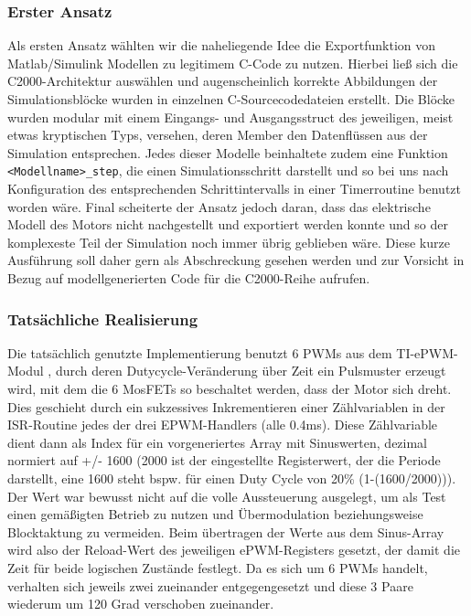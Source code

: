 \subsubsection{Erster Ansatz}
  Als ersten Ansatz wählten wir die naheliegende Idee die Exportfunktion von Matlab/Simulink Modellen zu legitimem C-Code zu nutzen. Hierbei ließ sich die C2000-Architektur auswählen und augenscheinlich korrekte Abbildungen der Simulationsblöcke wurden in einzelnen C-Sourcecodedateien erstellt. Die Blöcke wurden modular mit einem Eingangs- und Ausgangsstruct des jeweiligen, meist etwas kryptischen Typs,%
   versehen, deren Member den Datenflüssen aus der Simulation entsprechen. Jedes dieser Modelle beinhaltete zudem eine Funktion {\lstinline[breaklines=true]$<Modellname>_step$}, die einen Simulationsschritt darstellt und so bei uns nach Konfiguration des entsprechenden Schrittintervalls in einer Timerroutine benutzt worden wäre. Final scheiterte der Ansatz jedoch daran, dass das elektrische Modell des Motors nicht nachgestellt und exportiert werden konnte und so der komplexeste Teil der Simulation noch immer übrig geblieben wäre. Diese kurze Ausführung soll daher gern als Abschreckung gesehen werden %
    und zur Vorsicht in Bezug auf modellgenerierten Code für die C2000-Reihe aufrufen.

\subsubsection{Tatsächliche Realisierung}
  Die tatsächlich genutzte Implementierung benutzt 6 PWMs aus dem TI-ePWM-Modul , durch deren Dutycycle-Veränderung über Zeit ein Pulsmuster erzeugt wird, mit dem die 6 MosFETs so beschaltet werden, dass der Motor sich dreht. Dies geschieht durch ein sukzessives Inkrementieren einer Zählvariablen in der ISR-Routine jedes der drei EPWM-Handlers (alle 0.4ms). Diese Zählvariable dient dann als Index für ein vorgeneriertes Array mit Sinuswerten, dezimal normiert auf +/- 1600 (2000 ist der eingestellte Registerwert, der die Periode darstellt, eine 1600 steht bspw. für einen Duty Cycle von 20\% (1-(1600/2000))). Der Wert war bewusst nicht auf die volle Aussteuerung ausgelegt, um als Test einen gemäßigten Betrieb zu nutzen und Übermodulation beziehungsweise Blocktaktung zu vermeiden.%
   Beim übertragen der Werte aus dem Sinus-Array wird also der Reload-Wert des jeweiligen ePWM-Registers gesetzt, der damit die Zeit für beide logischen Zustände festlegt. Da es sich um 6 PWMs handelt, verhalten sich jeweils zwei zueinander entgegengesetzt und diese 3 Paare wiederum um 120 Grad verschoben zueinander.  
 
